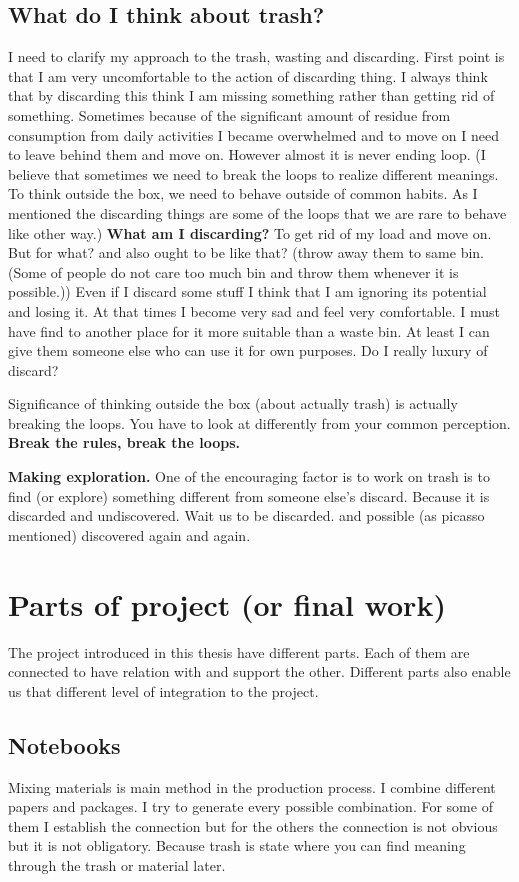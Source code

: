 \subsection{What do I think about trash?}
I need to clarify my approach to the trash, wasting and discarding. First point is that I am very uncomfortable to the action of discarding thing. I always think that by discarding this think I am missing something rather than getting rid of something. Sometimes because of the significant amount of residue from consumption from daily activities I became overwhelmed and to move on I need to leave behind them and move on. However almost it is never ending loop. (I believe that sometimes we need to break the loops to realize different meanings. To think outside the box, we need to behave outside of common habits. As I mentioned the discarding things are some of the loops that we are rare to behave like other way.) \textbf{What am I discarding?} To get rid of my load and move on. But for what? and also ought to be like that? (throw away them to same bin. (Some of people do not care too much bin and throw them whenever it is possible.)) Even if I discard some stuff I think that I am ignoring its potential and losing it. At that times I become very sad and feel very comfortable. I must have find to another place for it more suitable than a waste bin. At least I can give them someone else who can use it for own purposes. Do I really luxury of discard?

Significance of thinking outside the box (about actually trash) is actually breaking the loops. You have to look at differently from your common perception. \textbf{Break the rules, break the loops.}

\textbf{Making exploration.} One of the encouraging factor is to work on trash is to find (or explore) something different from someone else's discard. Because it is discarded and undiscovered. Wait us to be discarded. and possible (as picasso mentioned) discovered again and again. 

\section{Parts of project (or final work)}
The project introduced in this thesis have different parts. Each of them are connected to have relation with and support the other. Different parts also enable us that different level of integration to the project. 

\subsection{Notebooks}
Mixing materials is main method in the production process. I combine different papers and packages. I try to generate every possible combination. For some of them I establish the connection but for the others the connection is not obvious but it is not obligatory. Because trash is state where you can find meaning through the trash or material later. 

